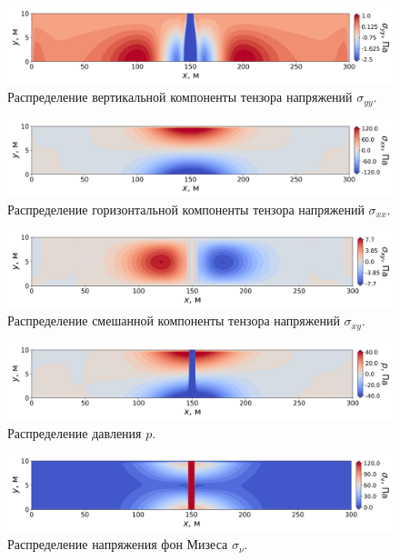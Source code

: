 \begin{figure}[H]
    \centering
    \includegraphics[width=\textwidth]{images/stamp/stamp_syy.png}
    \caption{Распределение вертикальной компоненты тензора напряжений $\sigma_{yy}$.}
    \label{fig:stamp_syy}
\end{figure}

\begin{figure}[H]
    \centering
    \includegraphics[width=\textwidth]{images/stamp/stamp_sxx.png}
    \caption{Распределение горизонтальной компоненты тензора напряжений $\sigma_{xx}$.}
    \label{fig:stamp_sxx}
\end{figure}

\begin{figure}[H]
    \centering
    \includegraphics[width=\textwidth]{images/stamp/stamp_sxy.png}
    \caption{Распределение смешанной компоненты тензора напряжений $\sigma_{xy}$.}
    \label{fig:stamp_sxy}
\end{figure}

\begin{figure}[H]
    \centering
    \includegraphics[width=\textwidth]{images/stamp/stamp_p.png}
    \caption{Распределение давления $p$.}
    \label{fig:stamp_p}
\end{figure}

\begin{figure}[H]
    \centering
    \includegraphics[width=\textwidth]{images/stamp/stamp_mises.png}
    \caption{Распределение напряжения фон Мизеса $\sigma_\nu$.}
    \label{fig:stamp_mises}
\end{figure}

